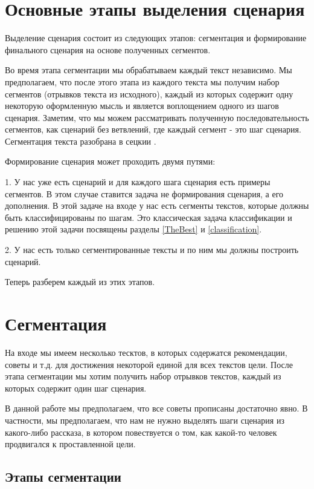 \documentclass[12pt]{article}
\begin{document}
\tableofcontents
\newpage

\section{Основные этапы выделения сценария}
\label{marker1}

Выделение сценария состоит из следующих этапов: сегментация и формирование финального сценария на основе полученных сегментов.

Во время  этапа сегментации мы обрабатываем каждый текст независимо. Мы предполагаем, что после этого этапа из каждого текста мы получим набор сегментов (отрывков текста из исходного), каждый из которых содержит одну некоторую оформленную мысль и является воплощением одного из шагов сценария. Заметим, что мы можем рассматривать полученную последовательность сегментов, как сценарий без ветвлений, где каждый сегмент  - это шаг сценария. Сегментация текста разобрана в сецкии .

Формирование сценария может проходить двумя путями: 

1. У нас уже есть сценарий и для каждого шага сценария есть примеры сегментов. В этом случае ставится задача не формирования сценария, а его дополнения. В этой задаче на входе у нас есть сегменты текстов, которые должны быть классифицированы по шагам. Это классическая задача классификации и решению этой задачи посвящены разделы \ref{TheBest} и \ref{classification}.

2. У нас есть только сегментированные тексты и по ним мы должны построить сценарий.

Теперь разберем каждый из этих этапов. 

\section{Сегментация}
\label{segm}

На входе мы имеем несколько тесктов, в которых содержатся рекомендации, советы и т.д. для достижения некоторой единой для всех текстов цели. После этапа сегментации мы хотим получить набор отрывков текстов, каждый из которых содержит один шаг сценария.

В данной работе мы предполагаем, что все советы прописаны достаточно явно. В частности, мы предполагаем, что нам не нужно выделять шаги сценария из какого-либо рассказа, в котором повествуется о том, как какой-то человек продвигался к проставленной цели.

\subsection{Этапы сегментации}
\end{document}
